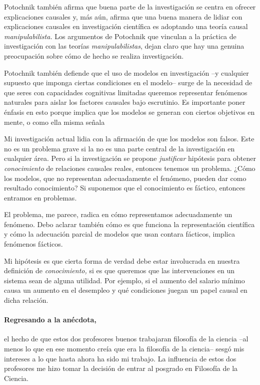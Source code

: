 Potochnik también afirma que buena parte de la investigación se centra en ofrecer explicaciones causales y, más aún, afirma que una buena manera de
lidiar con explicaciones causales en investigación científica es adoptando una teoría causal \emph{manipulabilista.} 
Los argumentos de Potochnik que vinculan a la práctica de investigación con las teorías \emph{manipulabilistas}, dejan claro que hay una genuina preocupación sobre cómo de hecho se realiza investigación.

Potochnik también defiende que el uso de modelos en investigación --y cualquier supuesto que imponga ciertas condiciones en el modelo-- surge de la necesidad de que seres con capacidades cognitivas limitadas queremos representar fenómenos naturales para aislar los factores causales bajo escrutinio. 
Es importante poner énfasis en esto porque implica que los modelos se generan con ciertos objetivos en mente, o como ella misma señala  

Mi investigación actual lidia con la afirmación de que los modelos son falsos. 
Este no es un problema grave si la  no es una parte central de la investigación en cualquier área. 
Pero si la investigación se propone \emph{justificar} hipótesis para obtener \emph{conocimiento} de relaciones causales reales, entonces tenemos un problema.
¿Cómo los modelos, que no representan adecuadamente el fenómeno, pueden dar como resultado conocimiento?
Si suponemos que el conocimiento es fáctico, entonces entramos en problemas.

El problema, me parece, radica en cómo representamos adecuadamente un fenómeno. 
Debo aclarar también cómo es que funciona la representación científica y cómo la adecuación parcial de modelos que usan contara fácticos, implica fenómenos fácticos.

Mi hipótesis es que cierta forma de verdad debe estar involucrada en nuestra definición de \emph{conocimiento,} si es que queremos que las intervenciones en un sistema sean de alguna utilidad. 
Por ejemplo, si el aumento del salario mínimo causa un aumento en el desempleo y qué condiciones juegan un papel causal en dicha relación.

\paragraph{Regresando a la anécdota,} el hecho de que estos dos profesores buenos trabajaran filosofía de la
ciencia --al menos lo que en ese momento creía que era la filosofía de la ciencia-- sesgó mis intereses a lo que hasta ahora ha sido mi trabajo.
La influencia de estos dos profesores me hizo tomar la decisión de entrar al posgrado en Filosofía de la Ciencia.

